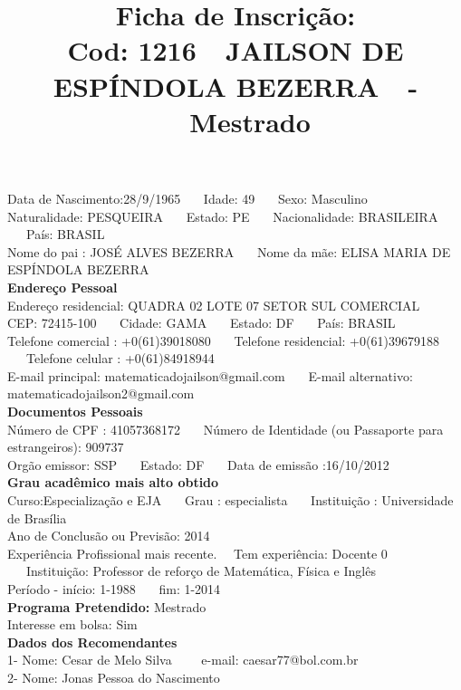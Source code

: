 \documentclass[11pt]{article}
\title{\vspace*{-4cm} Ficha de Inscrição: \\Cod: 1216\ \ JAILSON DE ESPÍNDOLA BEZERRA\ \ - \ \ Mestrado 
 }
\date{}
\begin{document}
\maketitle
\vspace*{-1.5cm}
\noindent Data de Nascimento:28/9/1965
\ \ \ Idade: 49   \ \ \ Sexo: Masculino
\\
Naturalidade: PESQUEIRA  
\ \ \  Estado: PE
\ \ \  Nacionalidade: BRASILEIRA
\ \ \ País: BRASIL
\\        
Nome do pai : JOSÉ ALVES BEZERRA
\ \ \ Nome da mãe: ELISA MARIA DE ESPÍNDOLA BEZERRA          
\\[0.2cm]                     
\textbf{Endereço Pessoal} 
\\ 
\noindent Endereço residencial: QUADRA 02 LOTE 07 SETOR SUL COMERCIAL
\\
        CEP: 72415-100 
\ \ \ Cidade: GAMA 
\ \ \ Estado: DF 
\ \ \ País: BRASIL
\\		
		Telefone comercial : +0(61)39018080
\ \ \ Telefone residencial: +0(61)39679188
\ \ \ Telefone celular : +0(61)84918944
\\
E-mail principal: matematicadojailson@gmail.com
\ \ \ E-mail alternativo: matematicadojailson2@gmail.com 
\\[0.2cm] 
\textbf{Documentos Pessoais}
\\
\noindent Número de CPF : 41057368172
\ \ \ Número de Identidade (ou Passaporte para estrangeiros): 909737
\\
Orgão emissor: SSP
\ \ \ Estado: DF
\ \ \ Data de emissão :16/10/2012
\\[0.3cm]
\textbf{Grau acadêmico mais alto obtido}
\\	
Curso:Especialização e EJA
\ \ \ Grau : especialista
\ \ \ Instituição : Universidade de Brasília
\\			
Ano de Conclusão ou Previsão: 2014
\\ 
Experiência Profissional mais recente. \ \  
Tem experiência: Docente 0  
\ \ \ Instituição: Professor de reforço de Matemática, Física e Inglês
\\  
Período - início: 1-1988
\ \ \ fim: 1-2014
\\[0.2cm] 
\textbf{Programa Pretendido:} Mestrado\\
Interesse em bolsa: Sim
\\[0.3cm]		
\textbf{Dados dos Recomendantes} 
\\
1- Nome: Cesar de Melo Silva
\ \ \ \  e-mail: caesar77@bol.com.br 
\\
2- Nome: Jonas Pessoa do Nascimento
\end{document}
